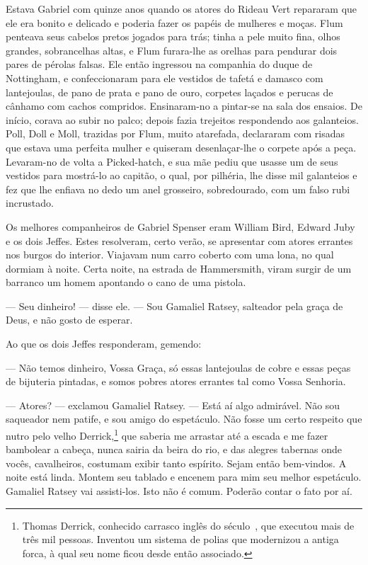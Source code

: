 Estava Gabriel com quinze anos quando os atores do Rideau Vert repararam
que ele era bonito e delicado e poderia fazer os papéis de mulheres e
moças. Flum penteava seus cabelos pretos jogados para trás; tinha a pele
muito fina, olhos grandes, sobrancelhas altas, e Flum furara-lhe as
orelhas para pendurar dois pares de pérolas falsas. Ele então ingressou na
companhia do duque de Nottingham, e confeccionaram para ele vestidos de
tafetá e damasco com lantejoulas, de pano de prata e pano de ouro,
corpetes laçados e perucas de cânhamo com cachos compridos. Ensinaram-no a
pintar-se na sala dos ensaios. De início, corava ao subir no palco; depois
fazia trejeitos respondendo aos galanteios. Poll, Doll e Moll, trazidas
por Flum, muito atarefada, declararam com risadas que estava uma perfeita
mulher e quiseram desenlaçar-lhe o corpete após a peça. Levaram-no de
volta a Picked-hatch, e sua mãe pediu que usasse um de seus vestidos para
mostrá-lo ao capitão, o qual, por pilhéria, lhe disse mil galanteios e fez
que lhe enfiava no dedo um anel grosseiro, sobredourado, com um falso rubi
incrustado.

Os melhores companheiros de Gabriel Spenser eram William Bird, Edward Juby
e os dois Jeffes. Estes resolveram, certo verão, se apresentar com atores
errantes nos burgos do interior. Viajavam num carro coberto com uma lona,
no qual dormiam à noite. Certa noite, na estrada de Hammersmith, viram
surgir de um barranco um homem apontando o cano de uma pistola.

--- Seu dinheiro! --- disse ele. --- Sou Gamaliel Ratsey, salteador pela graça de
Deus, e não gosto de esperar.

Ao que os dois Jeffes responderam, gemendo:

--- Não temos dinheiro, Vossa Graça, só essas lantejoulas de cobre e essas
peças de bijuteria pintadas, e somos pobres atores errantes tal como Vossa
Senhoria.

--- Atores? --- exclamou Gamaliel Ratsey. --- Está aí algo admirável. Não sou
saqueador nem patife, e sou amigo do espetáculo. Não fosse um certo
respeito que nutro pelo velho Derrick,\footnote{ Thomas Derrick, conhecido
carrasco inglês do século~, que executou mais de três mil pessoas.
Inventou um sistema de polias que modernizou a antiga forca, à qual seu
nome ficou desde então associado.} que saberia me arrastar até a
escada e me fazer bambolear a cabeça, nunca sairia da beira do rio, e das
alegres tabernas onde vocês, cavalheiros, costumam exibir tanto espírito.
Sejam então bem-vindos. A noite está linda. Montem seu tablado e encenem
para mim seu melhor espetáculo. Gamaliel Ratsey vai assisti-los. Isto não
é comum. Poderão contar o fato por aí.

